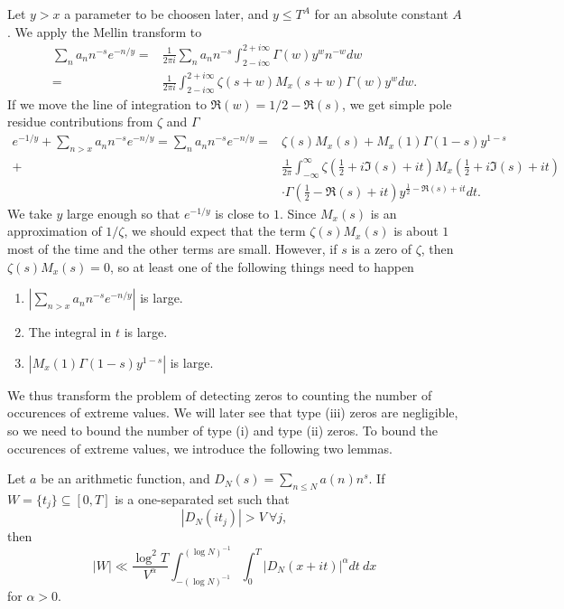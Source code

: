 Let $y>x$ a parameter to be choosen later, and $y\leq T^A$ for an absolute constant $A$. We apply the Mellin transform to \begin{equation*}
    \begin{split}
    \sum_{n}a_n n^{-s} e^{-n/y}=&\frac{1}{2\pi i}\sum_{n}a_n n^{-s} \int_{2-i\infty}^{2+i\infty}\Gamma(w) y^w n^{-w} dw\\
    =&\frac{1}{2\pi i}\int_{2-i\infty}^{2+i\infty}\zeta(s+w)M_x(s+w)\Gamma(w) y^w dw.
    \end{split}
\end{equation*}
If we move the line of integration to $\Re(w) = 1/2 - \Re(s)$, we get simple pole residue contributions from $\zeta$ and $\Gamma$ \begin{equation}
    \label{huxleyperron}
    \begin{split}
    e^{-1/y}+\sum_{n>x}a_n n^{-s} e^{-n/y}=\sum_{n}a_n n^{-s} e^{-n/y}=&\zeta(s)M_x(s) +M_x(1)\Gamma(1-s)y^{1-s}\\+&
    \frac{1}{2\pi}\int_{-\infty}^{\infty}\zeta(\frac{1}{2}+i\Im(s)+it)M_x(\frac{1}{2}+i\Im(s)+it)\\ &\cdot \Gamma\left(\frac{1}{2}-\Re(s)+it\right) y^{\frac{1}{2}-\Re(s)+it} dt.
    \end{split}
\end{equation}
We take $y$ large enough so that $e^{-1/y}$ is close to $1$. Since $M_x(s)$ is an approximation of $1/\zeta$, we should expect that the term $\zeta(s)M_x(s)$ is about $1$ most of the time and the other terms are small. However, if $s$ is a zero of $\zeta$, then $\zeta(s)M_x(s)=0$, so at least one of the following things need to happen \begin{enumerate}[label=(\roman{*})]
    \item $|\sum_{n>x}a_n n^{-s} e^{-n/y}|$ is large.
    \item The integral in $t$ is large.
    \item $|M_x(1)\Gamma(1-s)y^{1-s}|$ is large.
\end{enumerate}
We thus transform the problem of detecting zeros to counting the number of occurences of extreme values. We will later see that type (iii) zeros are negligible, so we need to bound the number of type (i) and type (ii) zeros. To bound the occurences of extreme values, we introduce the following two lemmas.
\iffalse
\begin{lemma}
    Let $a$ be an arithmetic function, and $D_N(s)=\sum_{n\leq N}a(n)n^{s}.$
    If $W = \{t_j\}\subseteq [0,T]$ is a one-separated set such that \[
        |D_N(it_j)| > V \ \forall j,
    \]
    then \[
        |W|\ll \frac{\log^2 T}{V^\alpha} \int_{-(\log N)^{-1}}^{(\log N)^{-1}}
        \int_{0}^{T} |D_N(x+it)|^\alpha dt \ dx
        \]
    for $\alpha > 0$.
\end{lemma}
